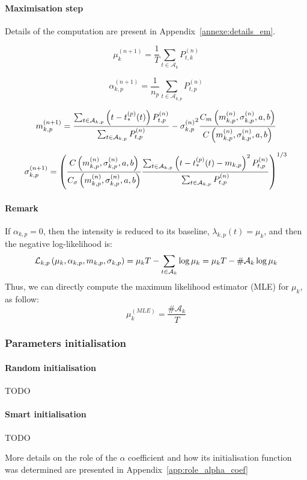 \paragraph{Maximisation step} Details of the computation are present in Appendix~\ref{annexe:details_em}.

\begin{equation}
    \mu_k^{(n+1)} = \frac{1}{T} \sum_{t\in\mathcal{A}_k} P_{t,k}^{(n)}
\end{equation}

\begin{equation}
    \alpha_{k,p}^{(n+1)} = \frac{1}{n_p} \sum_{t\in\mathcal{A}_{k,p}} P_{t,p}^{(n)}
\end{equation}

\begin{equation}
    m_{k,p}^{(n+1)} = \frac{\sum_{t\in\mathcal{A}_{k,p}} \left( t - t_*^{(p)}(t) \right) P_{t,p}^{(n)}}{\sum_{t\in\mathcal{A}_{k,p}} P_{t,p}^{(n)}} - {\sigma_{k,p}^{(n)}}^2 \frac{C_m\left( m_{k,p}^{(n)}, \sigma_{k,p}^{(n)},a,b \right)}{C\left( m_{k,p}^{(n)}, \sigma_{k,p}^{(n)},a,b \right)}
\end{equation}

\begin{equation}
    \sigma_{k,p}^{(n+1)} = \left( \frac{C\left( m_{k,p}^{(n)}, \sigma_{k,p}^{(n)},a,b \right)}{C_\sigma\left( m_{k,p}^{(n)}, \sigma_{k,p}^{(n)},a,b \right)} \frac{\sum_{t\in\mathcal{A}_{k,p}} \left( t - t_*^{(p)}(t) - m_{k,p} \right)^2 P_{t,p}^{(n)}}{\sum_{t\in\mathcal{A}_{k,p}}  P_{t,p}^{(n)}} \right)^{1/3}
\end{equation}

\paragraph{Remark} If $\alpha_{k,p} = 0$, then the intensity is reduced to its baseline, $\lambda_{k,p}(t) = \mu_k$, and then the negative log-likelihood is:
\begin{equation}
    \mathcal{L}_{k,p}\left( \mu_k, \alpha_{k,p}, m_{k,p}, \sigma_{k,p} \right) = \mu_k T -\sum_{t\in\mathcal{A}_k} \log \mu_k = \mu_k T - \#\mathcal{A}_k \log \mu_k
\end{equation}
Thus, we can directly compute the maximum likelihood estimator (MLE) for $\mu_k$, as follow:
\begin{equation}
    \mu_k^{(MLE)} = \frac{\#\mathcal{A}_k}{T}
\end{equation}

\subsubsection{Parameters initialisation}

\paragraph{Random initialisation}

TODO

\paragraph{Smart initialisation}

TODO

More details on the role of the $\alpha$ coefficient and how its initialisation function was determined are presented in Appendix~\ref{app:role_alpha_coef}


